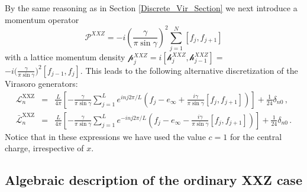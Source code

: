 \documentclass[a4paper,10pt]{article}
\newcommand{\q}{\mathfrak{q}}
\newcommand{\aSt}{\mathcal{W}}
\newcommand{\AStTL}[2]{\aSt_{#1,#2}}
\newcommand{\PN}{\mathcal{P}}
\newcommand{\KSgen}{\mathcal{L}}
\newcommand{\eXXZ}{f}
\begin{document}
By the same reasoning as in Section \ref{Discrete_Vir_Section} we next introduce a momentum operator
\begin{equation}\label{P_phi_XXZ}
\PN^{XXZ} = -i \left( \frac{\gamma}{ \pi \sin \gamma} \right)^2  \sum^{N}_{j=1} [f_j, f_{j+1} ] 
\end{equation}
with a lattice momentum density ${\mathcal p}_j^{XXZ} = i[{\mathcal h}_j^{XXZ},\mathcal{h}_{j-1}^{XXZ}]=$ \phantom{ }%
 $ -i \big(\frac{\gamma}{\pi\sin\gamma} \big)^2 [\eXXZ_{j-1},\eXXZ_j]$. This leads to the following alternative discretization of the Virasoro generators:
\begin{subequations}\label{generators_hi}
\begin{eqnarray}
%
\KSgen_n^{\text{XXZ}} &=& \frac{L}{4\pi} \left[ -\frac{\gamma}{\pi \sin \gamma}  \sum^{L}_{j=1} e^{inj2\pi/L} \left( f_j - e_\infty + \frac{i\gamma}{\pi \sin \gamma} [f_j, f_{j+1} ] \right)\right] + \frac{1}{24} \delta_{n0} \,, \\
%
\bar{\KSgen}_n^{\text{XXZ}} &=& \frac{L}{4\pi} \left[ -\frac{\gamma}{\pi \sin \gamma}  \sum^{L}_{j=1} e^{-inj2\pi/L} \left( f_j - e_\infty - \frac{i\gamma}{\pi \sin \gamma} [f_j, f_{j+1} ] \right)\right] + \frac{1}{24} \delta_{n0} \,.
%
\end{eqnarray}
\end{subequations}
%
Notice that in these expressions we have used the value $c=1$ for the central charge, irrespective of $x$. 





\subsection{Algebraic description of the ordinary XXZ case}

\end{document}
